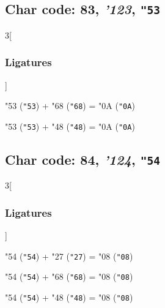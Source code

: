 \documentclass{article}
\newlength{\maxcharwidth}
\begin{document}
\subsection{Char code: 83, {\it'123}, {\tt"53}}
\label{char_83}


\begin{multicols}{3}[\subsubsection{Ligatures}]

{\testfont\char"53\noboundary} ({\tt"53}) + {\testfont\char"68\noboundary} ({\tt"68}) = {\testfont\char"0A\noboundary} ({\tt"0A}) 

{\testfont\char"53\noboundary} ({\tt"53}) + {\testfont\char"48\noboundary} ({\tt"48}) = {\testfont\char"0A\noboundary} ({\tt"0A}) 

\end{multicols}

\subsection{Char code: 84, {\it'124}, {\tt"54}}
\label{char_84}


\begin{multicols}{3}[\subsubsection{Ligatures}]

{\testfont\char"54\noboundary} ({\tt"54}) + {\testfont\char"27\noboundary} ({\tt"27}) = {\testfont\char"08\noboundary} ({\tt"08}) 

{\testfont\char"54\noboundary} ({\tt"54}) + {\testfont\char"68\noboundary} ({\tt"68}) = {\testfont\char"08\noboundary} ({\tt"08}) 

{\testfont\char"54\noboundary} ({\tt"54}) + {\testfont\char"48\noboundary} ({\tt"48}) = {\testfont\char"08\noboundary} ({\tt"08}) 

\end{multicols}
\end{document}
